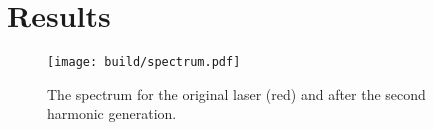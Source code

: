 \section{Results}
\label{sec:results}

\begin{figure*}
  \centering
  \texttt{[image: build/spectrum.pdf]}
  \caption{The spectrum for the original laser (red) and after the second harmonic generation.}
  \label{fig:spectrum}
\end{figure*}


